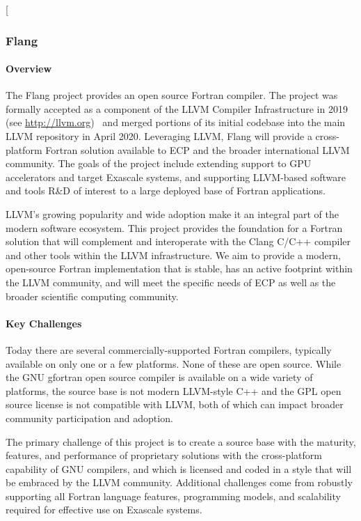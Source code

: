 [\subsubsection{ Flang}\label{subsubsect:flang}

\paragraph{Overview}

The Flang project provides an open source Fortran
\cite{iso-fortran-2004} \cite{iso-fortran-2010} \cite{iso-fortran-2018}
compiler.  The project was formally accepted as a component of the LLVM 
Compiler Infrastructure in 2019 (see \url{http://llvm.org})~\cite{llvm:homepage}
and merged portions of its initial codebase into the main
LLVM repository in April 2020. Leveraging LLVM, Flang will provide a
cross-platform Fortran solution available to ECP and the broader 
international LLVM community. The goals of the project include
extending support to GPU accelerators and target Exascale systems, and 
supporting LLVM-based software and tools R\&D of interest to a large 
deployed base of Fortran applications.

LLVM's growing popularity and wide adoption make it an integral part
of the modern software ecosystem. This project provides the foundation
for a Fortran solution that will complement and interoperate with the
Clang C/C++ compiler and other tools within the LLVM infrastructure.
We aim to provide a modern, open-source Fortran implementation that is
stable, has an active footprint within the LLVM community, and will
meet the specific needs of ECP as well as the broader scientific
computing community.

\paragraph{Key Challenges}
Today there are several commercially-supported Fortran compilers,
typically available on only one or a few platforms.  None of these are
open source.  While the GNU gfortran open source compiler is available
on a wide variety of platforms, the source base is not modern
LLVM-style C++ and the GPL open source license is not compatible with
LLVM, both of which can impact broader community participation and adoption.

The primary challenge of this project is to create a source base with
the maturity, features, and performance of proprietary solutions with
the cross-platform capability of GNU compilers, and which is licensed
and coded in a style that will be embraced by the LLVM community.
Additional challenges come from robustly supporting all Fortran
language features, programming models, and scalability required for 
effective use on Exascale systems. 

